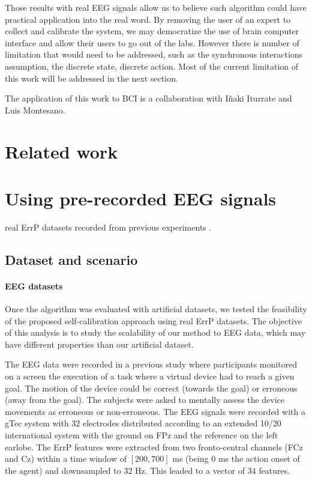 Those results with real EEG signals allow us to believe such algorithm could have practical application into the real word. By removing the user of an expert to collect and calibrate the system, we may democratize the use of brain computer interface and allow their users to go out of the labs. However there is number of limitation that would need to be addressed, such as the synchronous interactions assumption, the discrete state, discrete action. Most of the current limitation of this work will be addressed in the next section.

The application of this work to BCI is a collaboration with I{\~n}aki Iturrate and Luis Montesano.

\section{Related work}


\section{Using pre-recorded EEG signals}

real ErrP datasets recorded from previous experiments \cite{iturrate2013task}.

\subsection{Dataset and scenario}

\paragraph{EEG datasets} Once the algorithm was evaluated with artificial datasets, we tested the feasibility of the proposed self-calibration approach using real ErrP datasets. The objective of this analysis is to study the scalability of our method to EEG data, which may have different properties than our artificial dataset. 

The EEG data were recorded in a previous study \cite{iturrate2013task} where participants monitored on a screen the execution of a task where a virtual device had to reach a given goal. The motion of the device could be correct (towards the goal) or erroneous (away from the goal). The subjects were asked to mentally assess the device movements as erroneous or non-erroneous. The EEG signals were recorded with a gTec system with 32 electrodes distributed according to an extended 10/20 international system with the ground on FPz and the reference on the left earlobe. The ErrP features were extracted from two fronto-central channels (FCz and Cz) within a time window of $[200,700]$ ms (being 0 ms the action onset of the agent) and downsampled to $32$ Hz. This leaded to a vector of $34$ features.

